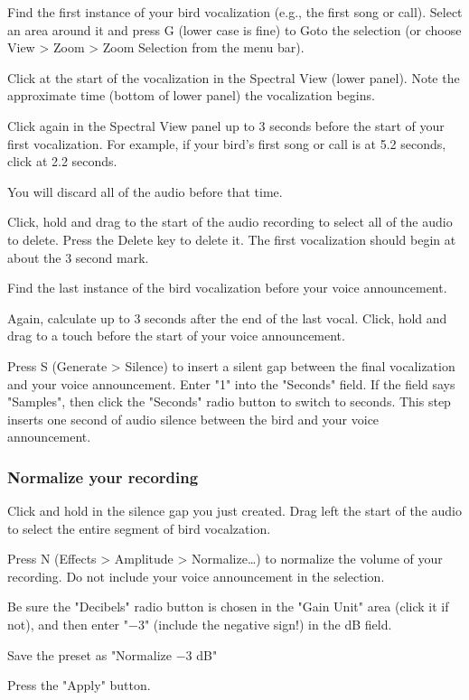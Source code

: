 \documentclass[12pt]{article}
\begin{document}
Find the first instance of your bird vocalization (e.g., the first song or call). Select an area around it and press G (lower case is fine) to Goto the selection (or choose View > Zoom > Zoom Selection from the menu bar).

Click at the start of the vocalization in the Spectral View (lower panel). Note the approximate time (bottom of lower panel) the vocalization begins. 

Click again in the Spectral View panel up to 3 seconds before the start of your first vocalization. For example, if your bird's first song or call is at 5.2 seconds, click at 2.2 seconds. 

You will discard all of the audio before that time.

Click, hold and drag to the start of the audio recording to select all of the audio to delete. Press the Delete key to delete it. The first vocalization should begin at about the 3 second mark.

Find the last instance of the bird vocalization before your voice announcement.

Again, calculate up to 3 seconds after the end of the last vocal. Click, hold and drag to a touch before the start of your voice announcement.

Press S (Generate > Silence) to insert a silent gap between the final vocalization and your voice announcement. Enter "1" into the "Seconds" field. If the field says "Samples", then click the "Seconds" radio button to switch to seconds. This step inserts one second of audio silence between the bird and your voice announcement.

\subsubsection*{Normalize your recording}

Click and hold in the silence gap you just created. Drag left the start of the audio to select the entire segment of bird vocalzation. 

Press N (Effects > Amplitude > Normalize\ldots) to normalize the volume of your recording. Do not include your voice announcement in the selection.

Be sure the "Decibels" radio button is chosen in the "Gain Unit" area (click it if not), and then enter "$-$3" (include the negative sign!) in the dB field. 

Save the preset as "Normalize $-$3 dB" 

Press the "Apply" button.
\end{document}
